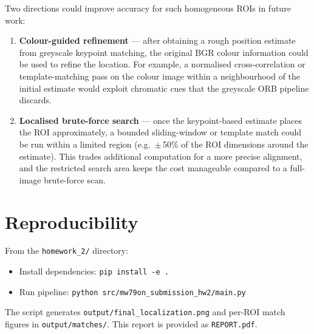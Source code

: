 \documentclass[11pt,a4paper]{article}
\begin{document}
Two directions could improve accuracy for such homogeneous ROIs in future work:
\begin{enumerate}[leftmargin=*]
    \item \textbf{Colour-guided refinement} --- after obtaining a rough position estimate from greyscale keypoint matching, the original BGR colour information could be used to refine the location.
        For example, a normalised cross-correlation or template-matching pass on the colour image within a neighbourhood of the initial estimate would exploit chromatic cues that the greyscale ORB pipeline discards.
    \item \textbf{Localised brute-force search} --- once the keypoint-based estimate places the ROI approximately, a bounded sliding-window or template match could be run within a limited region (e.g.\ $\pm$\,50\% of the ROI dimensions around the estimate).
        This trades additional computation for a more precise alignment, and the restricted search area keeps the cost manageable compared to a full-image brute-force scan.
\end{enumerate}

\section*{Reproducibility}
From the \texttt{homework\_2/} directory:
\begin{itemize}[leftmargin=*]
    \item Install dependencies: \texttt{pip install -e .}
    \item Run pipeline: \texttt{python src/mw79on\_submission\_hw2/main.py}
\end{itemize}
The script generates \texttt{output/final\_localization.png} and per-ROI match figures in \texttt{output/matches/}.
This report is provided as \texttt{REPORT.pdf}.
\end{document}
